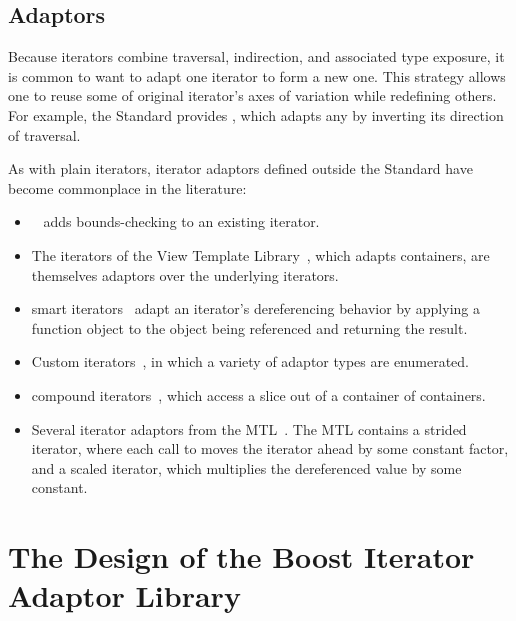 \documentclass{netobjectdays}
\newcommand{\reverseiterator}{\code{reverse\_\-iterator}}
\begin{document}
\subsection{Adaptors}

Because iterators combine traversal, indirection, and associated type
exposure, it is common to want to adapt one iterator to form a new
one. This strategy allows one to reuse some of original iterator's
axes of variation while redefining others. For example, the Standard
provides \reverseiterator{}, which adapts any
 by inverting its direction of
traversal.

As with plain iterators, iterator adaptors defined outside the
Standard have become commonplace in the literature:\begin{itemize}

\item {}~\cite{stroustrup00:_cpp_prog_lang} adds
bounds-checking to an existing iterator.

 \item The iterators of the View Template
Library~\cite{TMPW00:Weiser}, which adapts containers, are themselves
adaptors over the underlying iterators.

 \item smart iterators~\cite{becker98:_smart_iteraters}
adapt an iterator's dereferencing behavior by applying a
function object to the object being referenced and returning the
result.

 \item Custom iterators~\cite{TMPW00:Baus},
in which a variety of adaptor types are enumerated.

 \item compound iterators~\cite{alexandrescu98:_compound_iters},
   which access a slice out of a container of containers. 

 \item Several iterator adaptors from the MTL~\cite{siek99:_scitools}.
  The MTL contains a strided iterator, where each call to 
  moves the iterator ahead by some constant factor, and a 
  scaled iterator, which multiplies the dereferenced value by some
  constant. 

\end{itemize}

\section{The Design of the Boost Iterator Adaptor Library}
\end{document}
